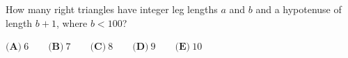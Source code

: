How many right triangles have integer leg lengths $a$ and $b$ and a hypotenuse of length $b+1$, where $b<100$?

$\textbf{(A)}\ 6\qquad\textbf{(B)}\ 7\qquad\textbf{(C)}\ 8\qquad\textbf{(D)}\ 9\qquad\textbf{(E)}\ 10$
